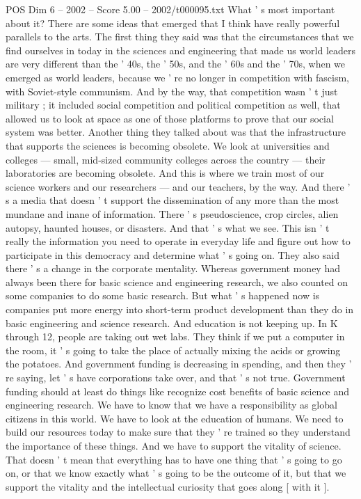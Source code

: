 \begin{textsample}{POS Dim 6 – 2002 – Score 5.00 – 2002/t000095.txt}
What ' s most important about it?
There are some ideas that emerged that I think have really powerful parallels to the arts.
The first thing they said was that the circumstances that we find ourselves in today in the sciences and engineering that made us world leaders are very different than the ' 40s, the ' 50s, and the ' 60s and the ' 70s, when we emerged as world leaders, because we ' re no longer in competition with fascism, with Soviet-style communism.
And by the way, that competition wasn ' t just military ; it included social competition and political competition as well, that allowed us to look at space as one of those platforms to prove that our social system was better.
Another thing they talked about was that the infrastructure that supports the sciences is becoming obsolete.
We look at universities and colleges — small, mid-sized community colleges across the country — their laboratories are becoming obsolete.
And this is where we train most of our science workers and our researchers — and our teachers, by the way.
And there ' s a media that doesn ' t support the dissemination of any more than the most mundane and inane of information.
There ' s pseudoscience, crop circles, alien autopsy, haunted houses, or disasters.
And that ' s what we see.
This isn ' t really the information you need to operate in everyday life and figure out how to participate in this democracy and determine what ' s going on.
They also said there ' s a change in the corporate mentality.
Whereas government money had always been there for basic science and engineering research, we also counted on some companies to do some basic research.
But what ' s happened now is companies put more energy into short-term product development than they do in basic engineering and science research.
And education is not keeping up.
In K through 12, people are taking out wet labs.
They think if we put a computer in the room, it ' s going to take the place of actually mixing the acids or growing the potatoes.
And government funding is decreasing in spending, and then they ' re saying, let ' s have corporations take over, and that ' s not true.
Government funding should at least do things like recognize cost benefits of basic science and engineering research.
We have to know that we have a responsibility as global citizens in this world.
We have to look at the education of humans.
We need to build our resources today to make sure that they ' re trained so they understand the importance of these things.
And we have to support the vitality of science.
That doesn ' t mean that everything has to have one thing that ' s going to go on, or that we know exactly what ' s going to be the outcome of it, but that we support the vitality and the intellectual curiosity that goes along [ with it ].

\end{textsample}
